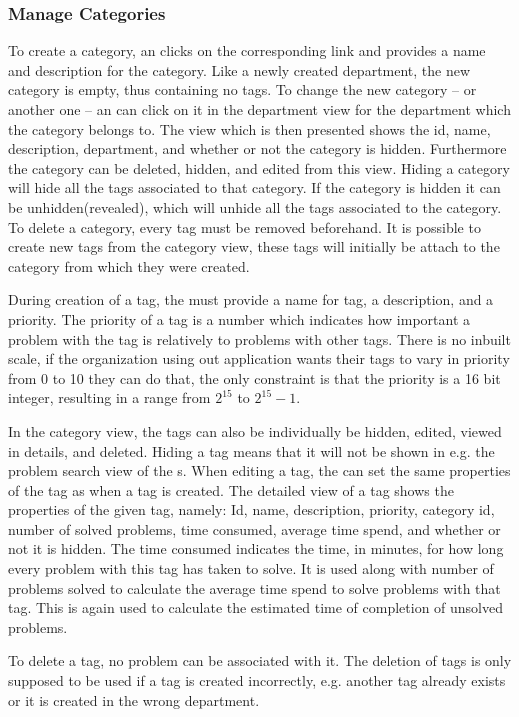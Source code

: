 \subsubsection{Manage Categories}
To create a category, an \admin[] clicks on the corresponding link and provides a name and description for the category.
Like a newly created department, the new category is empty, thus containing no tags.
To change the new category -- or another one -- an \admin[] can click on it in the department view for the department which the category belongs to.
The view which is then presented shows the id, name, description, department, and whether or not the category is hidden.
Furthermore the category can be deleted, hidden, and edited from this view.
Hiding a category will hide all the tags associated to that category.
If the category is hidden it can be unhidden(revealed), which will unhide all the tags associated to the category.
To delete a category, every tag must be removed beforehand.
It is possible to create new tags from the category view, these tags will initially be attach to the category from which they were created.

During creation of a tag, the \admin[] must provide a name for tag, a description, and a priority.
The priority of a tag is a number which indicates how important a problem with the tag is relatively to problems with other tags.
There is no inbuilt scale, if the organization using out application wants their tags to vary in priority from 0 to 10 they can do that, the only constraint is that the priority is a 16 bit integer, resulting in a range from $2^{15}$ to $2^{15}-1$.

In the category view, the tags can also be individually be hidden, edited, viewed in details, and deleted.
Hiding a tag means that it will not be shown in e.g. the problem search view of the \aclient[]s.
When editing a tag, the \admin[] can set the same properties of the tag as when a tag is created.
The detailed view of a tag shows the properties of the given tag, namely: Id, name, description, priority, category id, number of solved problems, time consumed, average time spend, and whether or not it is hidden.
The time consumed indicates the time, in minutes, for how long every problem with this tag has taken to solve.
It is used along with number of problems solved to calculate the average time spend to solve problems with that tag.
This is again used to calculate the estimated time of completion of unsolved problems.

To delete a tag, no problem can be associated with it.
The deletion of tags is only supposed to be used if a tag is created incorrectly, e.g. another tag already exists or it is created in the wrong department.

